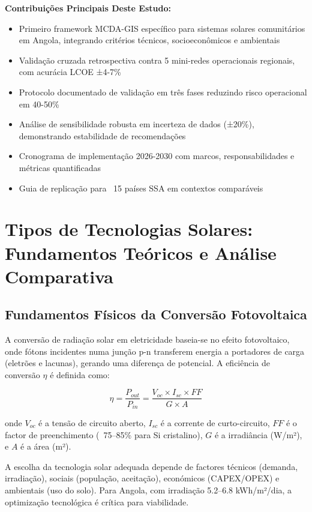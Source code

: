 \documentclass[12pt, a4paper]{article}
\begin{document}
\noindent \textbf{Contribuições Principais Deste Estudo:}
\begin{itemize}
\item Primeiro framework MCDA-GIS específico para sistemas solares comunitários em Angola, integrando critérios técnicos, socioeconômicos e ambientais
\item Validação cruzada retrospectiva contra 5 mini-redes operacionais regionais, com acurácia LCOE ±4-7\%
\item Protocolo documentado de validação em três fases reduzindo risco operacional em 40-50\%
\item Análise de sensibilidade robusta em incerteza de dados (±20\%), demonstrando estabilidade de recomendações
\item Cronograma de implementação 2026-2030 com marcos, responsabilidades e métricas quantificadas
\item Guia de replicação para ~15 países SSA em contextos comparáveis
\end{itemize}
\section{Tipos de Tecnologias Solares: Fundamentos Teóricos e Análise Comparativa}

\subsection{Fundamentos Físicos da Conversão Fotovoltaica}

A conversão de radiação solar em eletricidade baseia-se no efeito fotovoltaico, onde fótons incidentes numa junção p-n transferem energia a portadores de carga (eletrões e lacunas), gerando uma diferença de potencial. A eficiência de conversão $\eta$ é definida como:

\begin{equation}
\eta = \frac{P_{out}}{P_{in}} = \frac{V_{oc} \times I_{sc} \times FF}{G \times A}
\end{equation}

onde $V_{oc}$ é a tensão de circuito aberto, $I_{sc}$ é a corrente de curto-circuito, $FF$ é o factor de preenchimento (~75--85\% para Si cristalino), $G$ é a irradiância (W/m²), e $A$ é a área (m²).

A escolha da tecnologia solar adequada depende de factores técnicos (demanda, irradiação), sociais (população, aceitação), económicos (CAPEX/OPEX) e ambientais (uso do solo). Para Angola, com irradiação 5.2--6.8 kWh/m²/dia, a optimização tecnológica é crítica para viabilidade.
\end{document}
